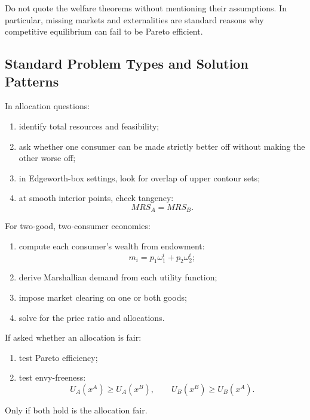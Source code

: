 \begin{commonmistake}
Do not quote the welfare theorems without mentioning their assumptions. In particular, missing markets and externalities are standard reasons why competitive equilibrium can fail to be Pareto efficient.
\end{commonmistake}

\subsection{Standard Problem Types and Solution Patterns}

\begin{examtip}[title={Method Pattern: Checking Pareto efficiency}]
In allocation questions:
\begin{enumerate}
    \item identify total resources and feasibility;
    \item ask whether one consumer can be made strictly better off without making the other worse off;
    \item in Edgeworth-box settings, look for overlap of upper contour sets;
    \item at smooth interior points, check tangency:
    \[
    MRS_A=MRS_B.
    \]
\end{enumerate}
\end{examtip}

\begin{examtip}[title={Method Pattern: Exchange equilibrium algebra}]
For two-good, two-consumer economies:
\begin{enumerate}
    \item compute each consumer's wealth from endowment:
    \[
    m_i = p_1 \omega_1^i + p_2 \omega_2^i;
    \]
    \item derive Marshallian demand from each utility function;
    \item impose market clearing on one or both goods;
    \item solve for the price ratio and allocations.
\end{enumerate}
\end{examtip}

\begin{examtip}[title={Method Pattern: Fairness questions}]
If asked whether an allocation is fair:
\begin{enumerate}
    \item test Pareto efficiency;
    \item test envy-freeness:
    \[
    U_A(x^A)\ge U_A(x^B),
    \qquad
    U_B(x^B)\ge U_B(x^A).
    \]
\end{enumerate}
Only if both hold is the allocation fair.
\end{examtip}

